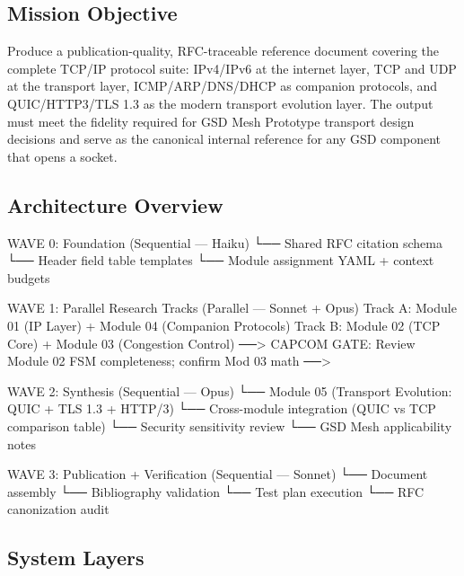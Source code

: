 \documentclass[11pt,letterpaper]{article}
\begin{document}
\subsection{Mission Objective}

Produce a publication-quality, RFC-traceable reference document covering the complete TCP/IP protocol suite: IPv4/IPv6 at the internet layer, TCP and UDP at the transport layer, ICMP/ARP/DNS/DHCP as companion protocols, and QUIC/HTTP3/TLS 1.3 as the modern transport evolution layer. The output must meet the fidelity required for GSD Mesh Prototype transport design decisions and serve as the canonical internal reference for any GSD component that opens a socket.

\subsection{Architecture Overview}

\begin{asciibox}
WAVE 0: Foundation (Sequential — Haiku)
  └── Shared RFC citation schema
  └── Header field table templates
  └── Module assignment YAML + context budgets

WAVE 1: Parallel Research Tracks (Parallel — Sonnet + Opus)
  Track A: Module 01 (IP Layer) + Module 04 (Companion Protocols)
  Track B: Module 02 (TCP Core) + Module 03 (Congestion Control)
  ──> CAPCOM GATE: Review Module 02 FSM completeness; confirm Mod 03 math ──>

WAVE 2: Synthesis (Sequential — Opus)
  └── Module 05 (Transport Evolution: QUIC + TLS 1.3 + HTTP/3)
  └── Cross-module integration (QUIC vs TCP comparison table)
  └── Security sensitivity review
  └── GSD Mesh applicability notes

WAVE 3: Publication + Verification (Sequential — Sonnet)
  └── Document assembly
  └── Bibliography validation
  └── Test plan execution
  └── RFC canonization audit
\end{asciibox}

\subsection{System Layers}
\end{document}
